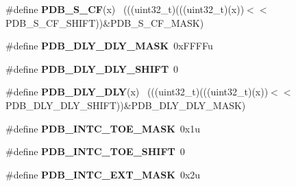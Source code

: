 \begin{DoxyCompactItemize}
\item 
\hypertarget{group___p_d_b___register___masks_gaa5b47758d8c9843160a413bbb6f63bc5}{}\#define {\bfseries P\+D\+B\+\_\+\+S\+\_\+\+C\+F}(x)                                                        ~(((uint32\+\_\+t)(((uint32\+\_\+t)(x))$<$$<$P\+D\+B\+\_\+\+S\+\_\+\+C\+F\+\_\+\+S\+H\+I\+F\+T))\&P\+D\+B\+\_\+\+S\+\_\+\+C\+F\+\_\+\+M\+A\+S\+K)\label{group___p_d_b___register___masks_gaa5b47758d8c9843160a413bbb6f63bc5}

\item 
\hypertarget{group___p_d_b___register___masks_ga79150887ba3f74efde99b40d3b9c5e44}{}\#define {\bfseries P\+D\+B\+\_\+\+D\+L\+Y\+\_\+\+D\+L\+Y\+\_\+\+M\+A\+S\+K}~0x\+F\+F\+F\+Fu\label{group___p_d_b___register___masks_ga79150887ba3f74efde99b40d3b9c5e44}

\item 
\hypertarget{group___p_d_b___register___masks_ga431302f6c6fd1396cbb05844f864d241}{}\#define {\bfseries P\+D\+B\+\_\+\+D\+L\+Y\+\_\+\+D\+L\+Y\+\_\+\+S\+H\+I\+F\+T}~0\label{group___p_d_b___register___masks_ga431302f6c6fd1396cbb05844f864d241}

\item 
\hypertarget{group___p_d_b___register___masks_ga15b6cdd6062cf0c5d1470da97faebb22}{}\#define {\bfseries P\+D\+B\+\_\+\+D\+L\+Y\+\_\+\+D\+L\+Y}(x)                                                  ~(((uint32\+\_\+t)(((uint32\+\_\+t)(x))$<$$<$P\+D\+B\+\_\+\+D\+L\+Y\+\_\+\+D\+L\+Y\+\_\+\+S\+H\+I\+F\+T))\&P\+D\+B\+\_\+\+D\+L\+Y\+\_\+\+D\+L\+Y\+\_\+\+M\+A\+S\+K)\label{group___p_d_b___register___masks_ga15b6cdd6062cf0c5d1470da97faebb22}

\item 
\hypertarget{group___p_d_b___register___masks_ga72fcf50548a0ad908e68c9dd67e61c2a}{}\#define {\bfseries P\+D\+B\+\_\+\+I\+N\+T\+C\+\_\+\+T\+O\+E\+\_\+\+M\+A\+S\+K}~0x1u\label{group___p_d_b___register___masks_ga72fcf50548a0ad908e68c9dd67e61c2a}

\item 
\hypertarget{group___p_d_b___register___masks_ga48ed5e2759aea8d4b6a4a47f1993cacc}{}\#define {\bfseries P\+D\+B\+\_\+\+I\+N\+T\+C\+\_\+\+T\+O\+E\+\_\+\+S\+H\+I\+F\+T}~0\label{group___p_d_b___register___masks_ga48ed5e2759aea8d4b6a4a47f1993cacc}

\item 
\hypertarget{group___p_d_b___register___masks_ga012fb0606d68eca77a9b15c2b8b8c995}{}\#define {\bfseries P\+D\+B\+\_\+\+I\+N\+T\+C\+\_\+\+E\+X\+T\+\_\+\+M\+A\+S\+K}~0x2u\label{group___p_d_b___register___masks_ga012fb0606d68eca77a9b15c2b8b8c995}


\end{DoxyCompactItemize}
